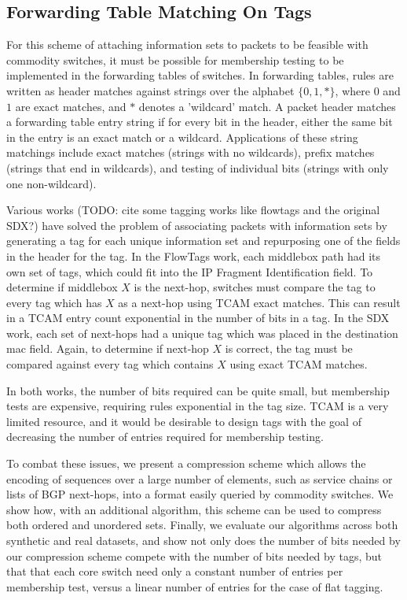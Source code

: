 \subsection{Forwarding Table Matching On Tags}

For this scheme of attaching information sets to packets to be feasible with commodity switches, it must be possible for membership testing to be implemented in the forwarding tables of switches. In forwarding tables, rules are written as header matches against strings over the alphabet $\{0,1,*\}$, where $0$ and $1$ are exact matches, and $*$ denotes a 'wildcard' match. A packet header matches a forwarding table entry string if for every bit in the header, either the same bit in the entry is an exact match or a wildcard. Applications of these string matchings include exact matches (strings with no wildcards), prefix matches (strings that end in wildcards), and testing of individual bits (strings with only one non-wildcard). 

Various works (TODO: cite some tagging works like flowtags and the original SDX?) have solved the problem of associating packets with information sets by generating a tag for each unique information set and repurposing one of the fields in the header for the tag. In the FlowTags work, each middlebox path had its own set of tags, which could fit into the IP Fragment Identification field. To determine if middlebox $X$ is the next-hop, switches must compare the tag to every tag which has $X$ as a next-hop using TCAM exact matches. This can result in a TCAM entry count exponential in the number of bits in a tag. In the SDX work, each set of next-hops had a unique tag which was placed in the destination mac field. Again, to determine if next-hop $X$ is correct, the tag must be compared against every tag which contains $X$ using exact TCAM matches. 

In both works, the number of bits required can be quite small, but membership tests are expensive, requiring rules exponential in the tag size. TCAM is a very limited resource, and it would be desirable to design tags with the goal of decreasing the number of entries required for membership testing. 

To combat these issues, we present a compression scheme which allows
the encoding of sequences over a large number of elements, such as service chains or lists of BGP next-hops, into a format easily queried by commodity switches. We show how, with an additional algorithm, this scheme can be used to compress both ordered and unordered sets. Finally, we evaluate our algorithms across both synthetic and real datasets, and show not only does the number of bits needed by our compression scheme compete with the number of bits needed by tags, but that that each core switch need only a constant number of entries per membership test, versus a linear number of entries for the case of flat tagging.


